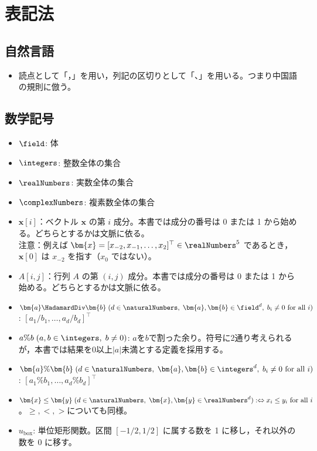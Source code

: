 \part{表記法}
	\chapter{自然言語}
	\begin{itemize}
		\item 読点として「，」を用い，列記の区切りとして「、」を用いる。つまり中国語の規則に倣う。
	\end{itemize}
	\chapter{数学記号}
		\newcommand*{\uBox}{u_\text{box}}
		\begin{itemize}
			\item $\field$: 体
			\item $\integers$: 整数全体の集合
			\item $\realNumbers$: 実数全体の集合
			\item $\complexNumbers$: 複素数全体の集合
			\item $\bm{x}[i]$：ベクトル $\bm{x}$ の第 $i$ 成分。本書では成分の番号は 0 または 1 から始める。どちらとするかは文脈に依る。\\
			注意：例えば $\bm{x} = [x_{-2},x_{-1},\dots,x_2]^\top\in\realNumbers^5$ であるとき，$\bm{x}[0]$ は $x_{-2}$ を指す（$x_0$ ではない）。
			\item $A[i,j]$：行列 $A$ の第 $(i,j)$ 成分。本書では成分の番号は 0 または 1 から始める。どちらとするかは文脈に依る。
			\item $\bm{a} \HadamardDiv \bm{b}\;(d \in \naturalNumbers,\;\bm{a},\bm{b} \in \field^d,\;b_i\neq 0 \text{ for all }i)$: $[a_1/b_1,\dots,a_d/b_d]^\top$
			\item $a\%b\;(a,b\in\integers,\;b\neq 0)$: $a$を$b$で割った余り。符号に2通り考えられるが，本書では結果を0以上$|a|$未満とする定義を採用する。
			\item $\bm{a}\%\bm{b}\;(d\in\naturalNumbers,\;\bm{a},\bm{b} \in \integers^d,\; b_i\neq 0 \text{ for all }i)$: $[a_1\%b_1,\dots,a_d\%b_d]^\top$
			\item $\bm{x} \leq \bm{y}\;(d\in\naturalNumbers,\;\bm{x},\bm{y} \in \realNumbers^d) :\Leftrightarrow x_i \leq y_i \text{ for all }i$。$\geq, <, >$についても同様。
			\item $\uBox$: 単位矩形関数。区間 $[-1/2,1/2]$ に属する数を 1 に移し，それ以外の数を 0 に移す。
		\end{itemize}
